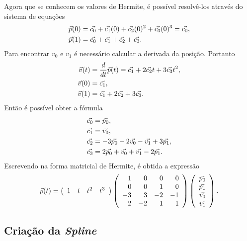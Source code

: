Agora que se conhecem os valores de Hermite, é possível resolvê-los através do sistema de equações
\begin{align}
    {\vec{p}}(0) &= {\vec{c_0}} + {\vec{c_1}}(0) + {\vec{c_2}}(0)^2 + {\vec{c_3}}(0)^3 = {\vec{c_0}}, \\
    {\vec{p}}(1) &= {\vec{c_0}} + {\vec{c_1}} + {\vec{c_2}} + {\vec{c_3}}.
\end{align}
Para encontrar $v_0$ e $v_1$ é necessário calcular a derivada da posição. Portanto
\begin{align}
    {\vec{v}}(t) &= \dfrac{d}{dt}{\vec{p}}(t) = {\vec{c_1}} + 2{\vec{c_2}}t + 3{\vec{c_3}}t^2,\\
    {\vec{v}}(0) &= {\vec{c_1}},\\
    {\vec{v}}(1) &= {\vec{c_1}} + 2{\vec{c_2}} + 3{\vec{c_3}}.
\end{align}
Então é possível obter a fórmula
\begin{align}
    {\vec{c_0}} &= {\vec{p_0}},\\
    {\vec{c_1}} &= {\vec{v_0}},\\
    {\vec{c_2}} &= -3{\vec{p_0}} - 2{\vec{v_0}} - {\vec{v_1}} + 3{\vec{p_1}},\\
    {\vec{c_3}} &= 2{\vec{p_0}} + {\vec{v_0}} + {\vec{v_1}} - 2{\vec{p_1}}. 
\end{align}
Escrevendo na forma matricial de Hermite, é obtida a expressão
\begin{equation}
    {\vec{p}}(t) =  
        \left(
        \begin{array}{rrrr}
            1 & t & t^2 & t^3
        \end{array}\right)
        \left(
        \begin{array}{rrrr}
            1 & 0 & 0 & 0 \\
            0 & 0 & 1 & 0 \\
            -3 & 3 & -2 & -1 \\
                2 & -2 & 1 & 1
        \end{array}\right)
    \left(
        \begin{array}{r}
            {\vec{p_0}} \\
            {\vec{p_1}} \\
            {\vec{v_0}} \\
            {\vec{v_1}}
        \end{array}\right).
 \end{equation}

 \subsection{Criação da \textit{Spline}}

